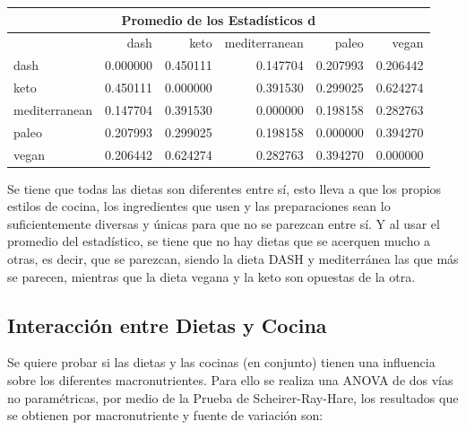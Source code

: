 \documentclass[12pt,a4paper]{article}
\begin{document}
{{            \begin{center}
                \begin{tabular}{lrrrrr}
                \toprule
                    \multicolumn{6}{c}{Promedio de los Estadísticos d} \\
                \midrule
                    & dash & keto & mediterranean & paleo & vegan \\
                \midrule
                    dash          & 0.000000 & 0.450111 & 0.147704 & 0.207993 & 0.206442 \\
                    keto          & 0.450111 & 0.000000 & 0.391530 & 0.299025 & 0.624274 \\
                    mediterranean & 0.147704 & 0.391530 & 0.000000 & 0.198158 & 0.282763 \\
                    paleo         & 0.207993 & 0.299025 & 0.198158 & 0.000000 & 0.394270 \\
                    vegan         & 0.206442 & 0.624274 & 0.282763 & 0.394270 & 0.000000 \\
                \bottomrule
                \end{tabular}
            \end{center}

            Se tiene que todas las dietas son diferentes entre sí, esto lleva a que 
            los propios estilos de cocina, los ingredientes que usen y las preparaciones 
            sean lo suficientemente diversas y únicas para que no se parezcan entre sí. 
            Y al usar el promedio del estadístico, se tiene que no hay dietas que se acerquen 
            mucho a otras, es decir, que se parezcan, siendo la dieta DASH y mediterránea las 
            que más se parecen, mientras que la dieta vegana y la keto son opuestas de la otra. 
        }

        \subsection{Interacción entre Dietas y Cocina}
        {
            Se quiere probar si las dietas y las cocinas (en conjunto) tienen una influencia 
            sobre los diferentes macronutrientes. Para ello se realiza una ANOVA de dos vías 
            no paramétricas, por medio de la Prueba de Scheirer-Ray-Hare, los resultados que 
            se obtienen por macronutriente y fuente de variación son:

}}
\end{document}
